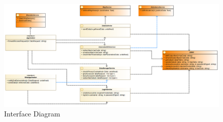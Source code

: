\begin{figure}[h]
\centering
\includegraphics[width=\linewidth]{resources/uml/Interfacediag}
\caption{Interface Diagram}\label{f:inter_diag}
\end{figure}

